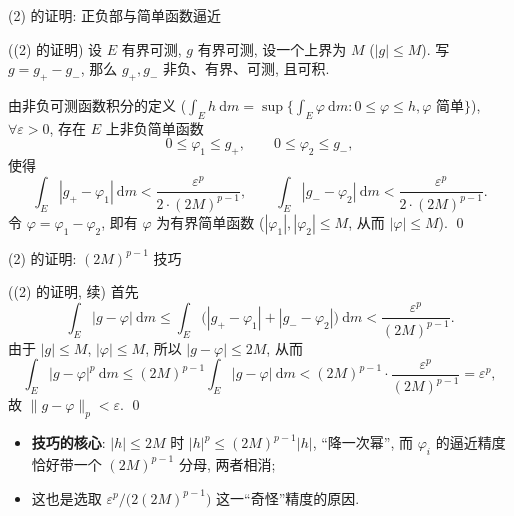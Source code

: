 
\begin{frame}{(2) 的证明: 正负部与简单函数逼近}

\startproof[bg=yellow, fg=red]((2) 的证明)
设 $E$ 有界可测, $g$ 有界可测, 设一个上界为 $M$ ($|g| \leqslant M$).
写 $g = g_+ - g_-$, 那么 $g_+, g_-$ 非负、有界、可测, 且可积.

\pause
由非负可测函数积分的定义
($\int_E h ~ \mathrm{d} m = \sup \big\{ \int_E \varphi ~ \mathrm{d} m : 0 \leqslant \varphi \leqslant h, \varphi \text{ 简单} \big\}$),
$\forall \varepsilon > 0$, 存在 $E$ 上非负简单函数
\[
0 \leqslant \varphi_1 \leqslant g_+,
\qquad
0 \leqslant \varphi_2 \leqslant g_-,
\]
使得
\[
\int_E |g_+ - \varphi_1| ~ \mathrm{d} m < \frac{\varepsilon^p}{2 \cdot (2M)^{p-1}},
\qquad
\int_E |g_- - \varphi_2| ~ \mathrm{d} m < \frac{\varepsilon^p}{2 \cdot (2M)^{p-1}} .
\]
\pause
令 $\varphi = \varphi_1 - \varphi_2$, 即有 $\varphi$ 为有界简单函数
($|\varphi_1|, |\varphi_2| \leqslant M$, 从而 $|\varphi| \leqslant M$).
\qed

\end{frame}


\begin{frame}{(2) 的证明: $(2M)^{p-1}$ 技巧}

\startproof[bg=yellow, fg=red]((2) 的证明, 续)
首先
\[
\int_E |g - \varphi| ~ \mathrm{d} m
\leqslant \int_E \big( |g_+ - \varphi_1| + |g_- - \varphi_2| \big) ~ \mathrm{d} m
< \frac{\varepsilon^p}{(2M)^{p-1}} .
\]
由于 $|g| \leqslant M$, $|\varphi| \leqslant M$, 所以 $|g - \varphi| \leqslant 2M$, 从而
\[
\int_E |g - \varphi|^p ~ \mathrm{d} m
\leqslant (2M)^{p-1} \int_E |g - \varphi| ~ \mathrm{d} m
< (2M)^{p-1} \cdot \frac{\varepsilon^p}{(2M)^{p-1}}
= \varepsilon^p ,
\]
故 $\lVert g - \varphi \rVert_p < \varepsilon$.
\qed

\pause

\begin{itemize}
\item \textbf{技巧的核心}: $|h| \leqslant 2M$ 时 $|h|^p \leqslant (2M)^{p-1} |h|$, ``降一次幂'', 而 $\varphi_i$ 的逼近精度恰好带一个 $(2M)^{p-1}$ 分母, 两者相消;
\item 这也是选取 $\varepsilon^p / \big( 2(2M)^{p-1} \big)$ 这一``奇怪''精度的原因.
\end{itemize}

\end{frame}

